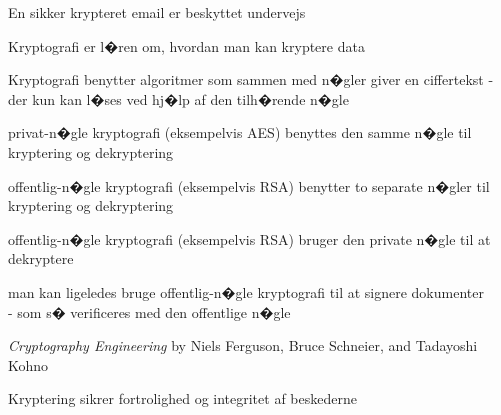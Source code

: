 \documentclass[20pt,landscape,a4paper,footrule]{foils}
\begin{document}

\centerline{En sikker krypteret email er beskyttet undervejs}




\begin{list1}
\item Kryptografi er l�ren om, hvordan man kan kryptere data
\item Kryptografi benytter algoritmer som sammen med n�gler giver en
  ciffertekst - der kun kan l�ses ved hj�lp af den tilh�rende n�gle
\end{list1}



\begin{list1}
\item privat-n�gle kryptografi (eksempelvis AES) benyttes den samme
  n�gle til kryptering og dekryptering
\item offentlig-n�gle kryptografi (eksempelvis RSA) benytter to
  separate n�gler til kryptering og dekryptering
\end{list1}



\begin{list1}
\item offentlig-n�gle kryptografi (eksempelvis RSA) bruger den private
  n�gle til at dekryptere
\item man kan ligeledes bruge offentlig-n�gle kryptografi til at
  signere dokumenter\\ - som s� verificeres med den offentlige n�gle
\end{list1}




\emph{Cryptography Engineering} by
Niels Ferguson, Bruce Schneier, and Tadayoshi Kohno

\centerline{Kryptering sikrer fortrolighed og integritet af beskederne}




\end{document}
